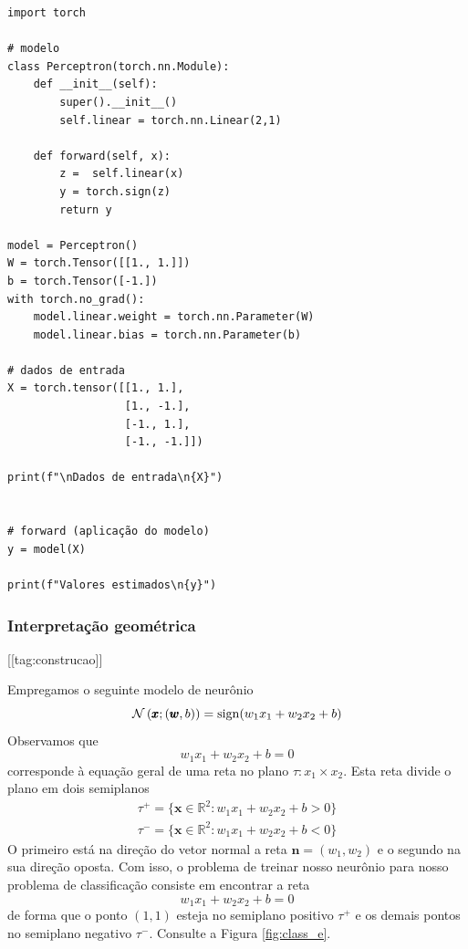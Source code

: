 \begin{lstlisting}[caption=perceptron.py, label=cap_perceptron_sec_unit:cod:perceptron]
import torch

# modelo
class Perceptron(torch.nn.Module):
    def __init__(self):
        super().__init__()
        self.linear = torch.nn.Linear(2,1)

    def forward(self, x):
        z =  self.linear(x)
        y = torch.sign(z)
        return y

model = Perceptron()
W = torch.Tensor([[1., 1.]])
b = torch.Tensor([-1.])
with torch.no_grad():
    model.linear.weight = torch.nn.Parameter(W)
    model.linear.bias = torch.nn.Parameter(b)

# dados de entrada
X = torch.tensor([[1., 1.],
                  [1., -1.],
                  [-1., 1.],
                  [-1., -1.]])

print(f"\nDados de entrada\n{X}")


# forward (aplicação do modelo)
y = model(X)

print(f"Valores estimados\n{y}")
\end{lstlisting}

\subsubsection{Interpretação geométrica}
[[tag:construcao]]

Empregamos o seguinte modelo de neurônio
\begin{equation}
  \mathcal{N}\left(\pmb{x};(\pmb{w},b)\right) = \operatorname{sign}(w_1x_1 + w_2x_2 + b)
\end{equation}
Observamos que
\begin{equation}
  w_1x_1 + w_2x_2 + b = 0
\end{equation}
corresponde à equação geral de uma reta no plano $\tau: x_1\times x_2$. Esta reta divide o plano em dois semiplanos
\begin{align}
  \tau^+ = \{\pmb{x}\in\mathbb{R}^2: w_1x_1 + w_2x_2 + b > 0\}\\
  \tau^- = \{\pmb{x}\in\mathbb{R}^2: w_1x_1 + w_2x_2 + b < 0\}
\end{align}
O primeiro está na direção do vetor normal a reta $\pmb{n} = (w_1, w_2)$ e o segundo na sua direção oposta. Com isso, o problema de treinar nosso neurônio para nosso problema de classificação consiste em encontrar a reta
\begin{equation}
  w_1x_1 + w_2x_2 + b = 0
\end{equation}
de forma que o ponto $(1,1)$ esteja no semiplano positivo $\tau^+$ e os demais pontos no semiplano negativo $\tau^-$. Consulte a Figura \ref{fig:class_e}.

